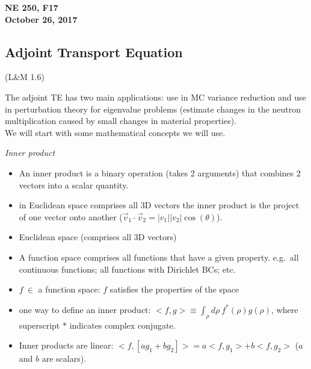 \documentclass[12pt]{article}
\begin{document}
\begin{center}
{\bf NE 250, F17\\
October 26, 2017 
}
\end{center}

\subsection*{Adjoint Transport Equation} (L\&M 1.6)

The adjoint TE has two main applications: use in MC variance reduction and use in perturbation theory for eigenvalue problems (estimate changes in the neutron multiplication caused by small changes in material properties). \\
We will start with some mathematical concepts we will use.

\textit{Inner product}
\begin{itemize}
\item An inner product is a binary operation (takes 2 arguments) that combines 2 vectors into a scalar quantity.
\item in Euclidean space comprises all 3D vectors the inner product is the project of one vector onto another ($\vec{v}_1 \cdot \vec{v}_2 = |v_1||v_2|\cos(\theta)$).
\item Euclidean space (comprises all 3D vectors)
\item A function space comprises all functions that have a given property. e.g.\ all continuous functions; all functions with Dirichlet BCs; etc.
\item $f \: \in$ a function space: $f$ satisfies the properties of the space
\item one way to define an inner product: $<f,g> \equiv \int_{\rho} d\rho \: f^{*}(\rho) g(\rho)$, where superscript $*$ indicates complex conjugate.
\item Inner products are linear: $<f, [ag_1 + bg_2]> = a<f, g_1> + b<f, g_2>$ ($a$ and $b$ are scalars).
\end{itemize}
\end{document}
